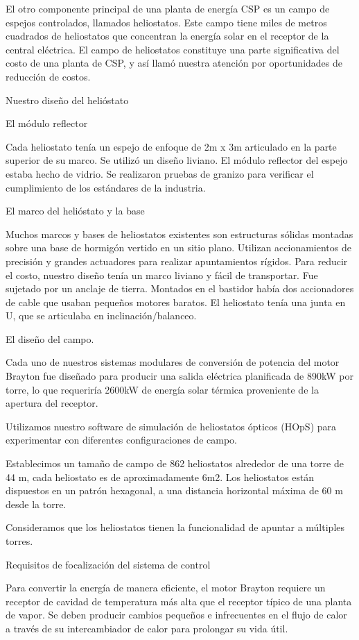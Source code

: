 \documentclass[12pt]{article}
\begin{document}
El otro componente principal de una planta de energía CSP es un campo de espejos controlados, llamados heliostatos. Este campo tiene miles de metros cuadrados de heliostatos que concentran la energía solar en el receptor de la central eléctrica. El campo de heliostatos constituye una parte significativa del costo de una planta de CSP, y así llamó nuestra atención por oportunidades de reducción de costos.

Nuestro diseño del helióstato

El módulo reflector

Cada heliostato tenía un espejo de enfoque de 2m x 3m articulado en la parte superior de su marco. Se utilizó un diseño liviano. El módulo reflector del espejo estaba hecho de vidrio. Se realizaron pruebas de granizo para verificar el cumplimiento de los estándares de la industria.

El marco del helióstato y la base

Muchos marcos y bases de heliostatos existentes son estructuras sólidas montadas sobre una base de hormigón vertido en un sitio plano. Utilizan accionamientos de precisión y grandes actuadores para realizar apuntamientos rígidos. Para reducir el costo, nuestro diseño tenía un marco liviano y fácil de transportar. Fue sujetado por un anclaje de tierra. Montados en el bastidor había dos accionadores de cable que usaban pequeños motores baratos. El heliostato tenía una junta en U, que se articulaba en inclinación/balanceo.

El diseño del campo.

Cada uno de nuestros sistemas modulares de conversión de potencia del motor Brayton fue diseñado para producir una salida eléctrica planificada de 890kW por torre, lo que requeriría 2600kW de energía solar térmica proveniente de la apertura del receptor.

Utilizamos nuestro software de simulación de heliostatos ópticos (HOpS) para experimentar con diferentes configuraciones de campo.

Establecimos un tamaño de campo de 862 heliostatos alrededor de una torre de 44 m, cada heliostato es de aproximadamente 6m2. Los heliostatos están dispuestos en un patrón hexagonal, a una distancia horizontal máxima de 60 m desde la torre.

Consideramos que los heliostatos tienen la funcionalidad de apuntar a múltiples torres.

Requisitos de focalización del sistema de control

Para convertir la energía de manera eficiente, el motor Brayton requiere un receptor de cavidad de temperatura más alta que el receptor típico de una planta de vapor. Se deben producir cambios pequeños e infrecuentes en el flujo de calor a través de su intercambiador de calor para prolongar su vida útil.
\end{document}
